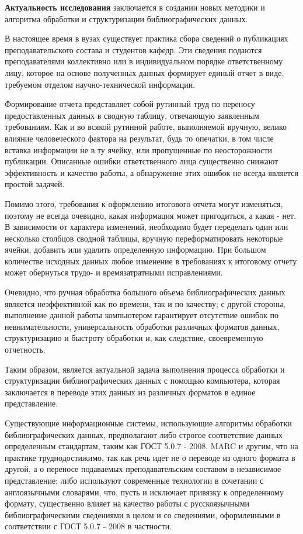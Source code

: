 \Introduction

\textbf{Актуальность исследования} заключается в создании новых методики и алгоритма обработки и структуризации библиографических данных.
 
В настоящее время в вузах существует практика сбора сведений о публикациях преподавательского состава и студентов кафедр. Эти сведения подаются преподавателями коллективно или в индивидуальном порядке ответственному лицу, которое на основе полученных данных формирует единый отчет в виде, требуемом отделом научно-технической информации.

Формирование отчета представляет собой рутинный труд по переносу предоставленных данных в сводную таблицу, отвечающую заявленным требованиям. Как и во всякой рутинной работе, выполняемой вручную, велико влияние человеческого фактора на результат, будь то опечатки, в том числе вставка информации не в ту ячейку, или пропущенные по неосторожности публикации. Описанные ошибки ответственного лица существенно снижают эффективность и качество работы, а обнаружение этих ошибок не всегда является простой задачей.

Помимо этого, требования к оформлению итогового отчета могут изменяться, поэтому не всегда очевидно, какая информация может пригодиться, а какая - нет. В зависимости от характера изменений, необходимо будет переделать один или несколько столбцов сводной таблицы, вручную переформатировать некоторые ячейки, добавить или удалить определенную информацию. При большом количестве исходных данных любое изменение в требованиях к итоговому отчету может обернуться трудо- и времязатратными  исправлениями.

Очевидно, что ручная обработка большого объема библиографических данных является неэффективной как по времени, так и по качеству; с другой стороны, выполнение данной работы компьютером гарантирует отсутствие ошибок по невнимательности, универсальность обработки различных форматов данных, структуризацию и быстроту обработки и, как следствие, своевременную отчетность.

Таким образом, является актуальной задача выполнения процесса обработки и структуризации библиографических данных с помощью компьютера, которая заключается в переводе этих данных из различных форматов в единое представление.
 
Существующие информационные системы, использующие алгоритмы обработки библиографических данных, предполагают либо строгое соответствие данных определенным стандартам, таким как ГОСТ 5.0.7 - 2008, MARC и другим, что на практике труднодостижимо, так как речь идет не о переводе из одного формата в другой, а о переносе подаваемых преподавательским составом в независимое представление; либо используют современные технологии в сочетании с англоязычными словарями, что, пусть и исключает привязку к определенному формату, существенно влияет на качество работы с русскоязычными библиографическими сведениями в целом и со сведениями, оформленными в соответствии с ГОСТ 5.0.7 - 2008 в частности.

